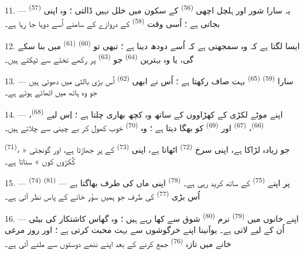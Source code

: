 11. --- یہ سارا شور اور ہلچل اچھی 
\textsuperscript{(56)} کے سکون میں خلل نہیں ڈالتی ؛ وہ اپنی
 \textsuperscript{(57)} بجاتی ہے ؛ اُسی وقت
 \textsuperscript{(58)} کے دروازے کے سامنے اُسے دوہا جا
رہا ہے۔

12. ایسا لگتا ہے کہ وہ سمجھتی ہے کہ اُسے دودھ دینا ہے ؛ تبھی تو
 \textsuperscript{(60)} 
\textsuperscript{(61)} میں  بنا سکے گی، یا وہ بہترین
 \textsuperscript{(64)} جو 
\textsuperscript{(63)} پر رکھے تختے سے ٹپکتے ہیں۔

13. --- سارا  \textsuperscript{(59)}
 \textsuperscript{(65)} بہت صاف رکھتا ہے ؛ اُس
نے ابھی  \textsuperscript{(62)} اُس بڑی
بالٹی میں دھوئی ہیں جو وہ ہاتھ میں اٹھائے ہوئے ہے۔

\VUsaut{3.0mm}
\VUsaut{3.0mm}

14. --- اپنے موٹے لکڑی کے کھڑاووں کے ساتھ وہ کچھ بھاری چلتا ہے ؛
اِس لیے  \textsuperscript{(68)}، 
\textsuperscript{(66)}،  \textsuperscript{(67)}
اور  \textsuperscript{(69)} کو بھگا دیتا ہے ؛ وہ
 \textsuperscript{(70)} خوب کھول کر بے چینی سے
چلاتے ہیں۔

 \textsuperscript{(71)}، جو زیادہ لڑاکا ہے، اپنی سرخ
 \textsuperscript{(72)} اٹھاتا ہے، اپنی 
\textsuperscript{(73)} کے پر جھاڑتا ہے، اور گونجتی « کُکڑوں کوں »
سناتا ہے۔

15. ---  \textsuperscript{(74)} 
\textsuperscript{(81)} پر اپنے  \textsuperscript{(75)}
کے ساتھ کرید رہی ہے۔  \textsuperscript{(78)} اپنی
ماں کی طرف بھاگتا ہے — اُس بڑی 
\textsuperscript{(77)} کی طرف جو ہمیں سؤر خانے کے پاس نظر آتی ہے۔

16. --- اپنے خانوں میں  \textsuperscript{(79)} نرم
 \textsuperscript{(80)} شوق سے کھا رہے ہیں ؛ وہ گھاس
کاشتکار کی بیٹی اُن کے لیے لاتی ہے۔ یوآنینا اپنے خرگوشوں سے بہت
محبت کرتی ہے ؛ اور روز مرغی خانے میں تازہ 
\textsuperscript{(76)} جمع کرنے کے بعد اپنے ننھے دوستوں سے ملنے آتی
ہے۔

\VUsaut{6.0mm}
\VUfilet{22mm}
